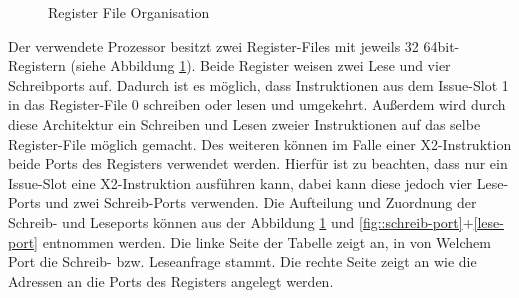 	\begin{figure}
		\vspace{-5pt}
		\begin{center}
			
		\end{center}
		\caption{Register File Organisation}
		\label{fig:reg_orga}
	\end{figure}
Der verwendete Prozessor besitzt zwei Register-Files mit jeweils 32 64bit-Registern (siehe Abbildung \ref{fig:reg_orga}). Beide Register weisen zwei Lese und vier Schreibports auf. Dadurch ist es möglich, dass Instruktionen aus dem Issue-Slot 1 in das Register-File 0 schreiben oder lesen und umgekehrt. Außerdem wird durch diese Architektur ein Schreiben und Lesen zweier Instruktionen auf das selbe Register-File möglich gemacht. Des weiteren können im Falle einer X2-Instruktion beide Ports des Registers verwendet werden. Hierfür ist zu beachten, dass nur ein Issue-Slot eine X2-Instruktion ausführen kann, dabei kann diese jedoch vier Lese-Ports und zwei Schreib-Ports verwenden. Die Aufteilung und  Zuordnung der Schreib- und Leseports können aus der Abbildung \ref{fig:reg_orga} und \ref{fig::schreib-port}+\ref{lese-port} entnommen werden. Die linke Seite der Tabelle zeigt an, in von Welchem Port die Schreib- bzw. Leseanfrage stammt. Die rechte Seite zeigt an wie die Adressen an die Ports des Registers angelegt werden.

\newpage

